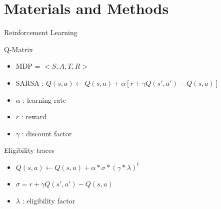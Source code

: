 \documentclass{bredelebeamer}
\begin{document}
\section{Materials and Methods}
\begin{frame}{Reinforcement Learning}

\begin{block}{Q-Matrix}
\begin{itemize}
\item MDP =  $< S, A, T, R >$
\item SARSA : $Q(s, a) \leftarrow  Q(s, a) +  \alpha [r + \gamma Q(s', a') - Q(s,a)]$
\item $\alpha$ : learning rate
\item $r$ : reward
\item $\gamma$ : discount factor
\end{itemize}
\end{block}

\begin{block}{Eligibility traces}
\begin{itemize}
\item $Q(s, a) \leftarrow  Q(s, a) +  \alpha *  \sigma *  (\gamma * \lambda)^t$
\item $\sigma = r + \gamma Q(s', a') - Q(s,a)$
\item $\lambda$ : eligibility factor
\end{itemize}
\end{block}

\end{frame}
\end{document}
